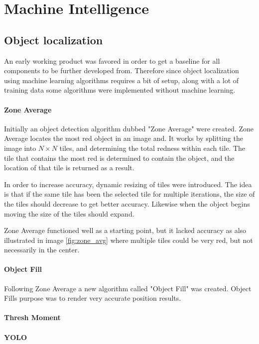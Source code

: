 \section{Machine Intelligence}\label{Design:MI}

\subsection{Object localization}
An early working product was favored in order to get a baseline for all components to be further developed from.
Therefore since object localization using machine learning algorithms requires a bit of setup, along with a lot of training data some algorithms were implemented without machine learning.

\paragraph{Zone Average}
Initially an object detection algorithm dubbed "Zone Average" were created.
Zone Average locates the most red object in an image and.
It works by splitting the image into $N\times N$ tiles, and determining the total redness within each tile.
The tile that contains the most red is determined to contain the object, and the location of that tile is returned as a result.

In order to increase accuracy, dynamic resizing of tiles were introduced.
The idea is that if the same tile has been the selected tile for multiple iterations, the size of the tiles should decrease to get better accuracy.
Likewise when the object begins moving the size of the tiles should expand.


Zone Average functioned well as a starting point, but it lacked accuracy as also illustrated in image \ref{fig:zone_avg} where multiple tiles could be very red, but not necessarily in the center.

\paragraph{Object Fill}
Following Zone Average a new algorithm called "Object Fill" was created.
Object Fills purpose was to render very accurate position results.



\paragraph{Thresh Moment}


\paragraph{YOLO}

